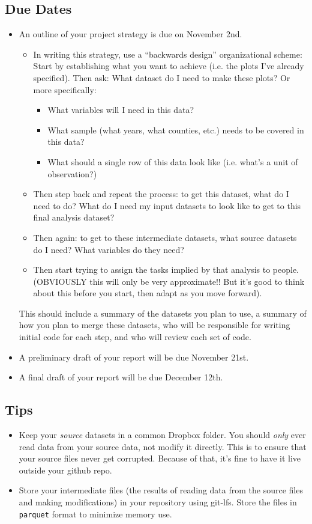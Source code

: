 \documentclass[12pt]{article}
\begin{document}
\subsection*{Due Dates}
\begin{itemize}
  \item An outline of your project strategy is due on November 2nd.
  \begin{itemize}
    \item In writing this strategy, use a ``backwards design'' organizational scheme: Start by establishing what you want to achieve (i.e. the plots I've already specified). Then ask: What dataset do I need to make these plots? Or more specifically:
    \begin{itemize}
      \item What variables will I need in this data?
      \item What sample (what years, what counties, etc.) needs to be covered in this data?
      \item What should a single row of this data look like (i.e. what's a unit of observation?)
    \end{itemize}
    \item Then step back and repeat the process: to get this dataset, what do I need to do? What do I need my input datasets to look like to get to this final analysis dataset?
    \item Then again: to get to these intermediate datasets, what source datasets do I need? What variables do they need?
    \item Then start trying to assign the tasks implied by that analysis to people. (OBVIOUSLY this will only be very approximate!! But it's good to think about this before you start, then adapt as you move forward).
  \end{itemize}
  This should include a summary of the datasets you plan to use, a summary of how you plan to merge these datasets, who will be responsible for writing initial code for each step, and who will review each set of code.
  \item A preliminary draft of your report will be due November 21st.
  \item A final draft of your report will be due December 12th.
\end{itemize}

\subsection*{Tips}
\begin{itemize}
  \item Keep your \emph{source} datasets in a common Dropbox folder. You should \emph{only} ever read data from your source data, not modify it directly. This is to ensure that your source files never get corrupted. Because of that, it's fine to have it live outside your github repo.
  \item Store your intermediate files (the results of reading data from the source files and making modifications) in your repository using git-lfs. Store the files in \texttt{parquet} format to minimize memory use.
\end{itemize}
\end{document}
